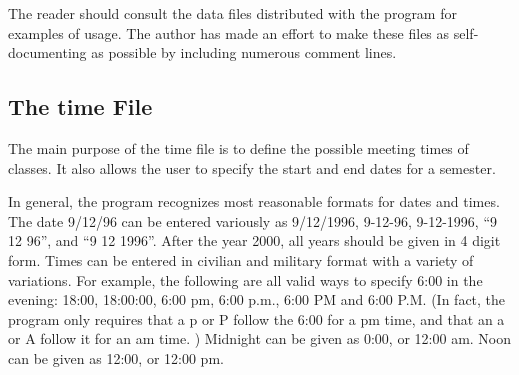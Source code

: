 The reader should consult the data files distributed with the program for
examples of usage. The author has made an effort to make these files as
self-documenting as possible by including numerous comment lines.
  
\subsection{The time File}

The main purpose of the time file is to define the possible meeting times
of classes. It also allows the user to specify the start and end dates for
a semester. 

In general, the program recognizes most reasonable formats for dates and times.
 The date 9/12/96 can be entered variously as 9/12/1996, 9-12-96,
9-12-1996, ``9 12 96'', and ``9 12 1996''. After the year 2000, all years
should be given in 4 digit form. 
Times can be entered in civilian
and military format with a variety of variations. For example, the following
are all valid ways to specify 6:00 in the evening: 18:00, 18:00:00, 6:00 pm,
6:00 p.m., 6:00 PM and 6:00 P.M. (In fact, the program only requires that
a p or P follow the 6:00 for a pm time, and that an a or A follow it for
an am time. ) Midnight can be given as 0:00, or 12:00 am. Noon can be
given as 12:00, or 12:00 pm.

